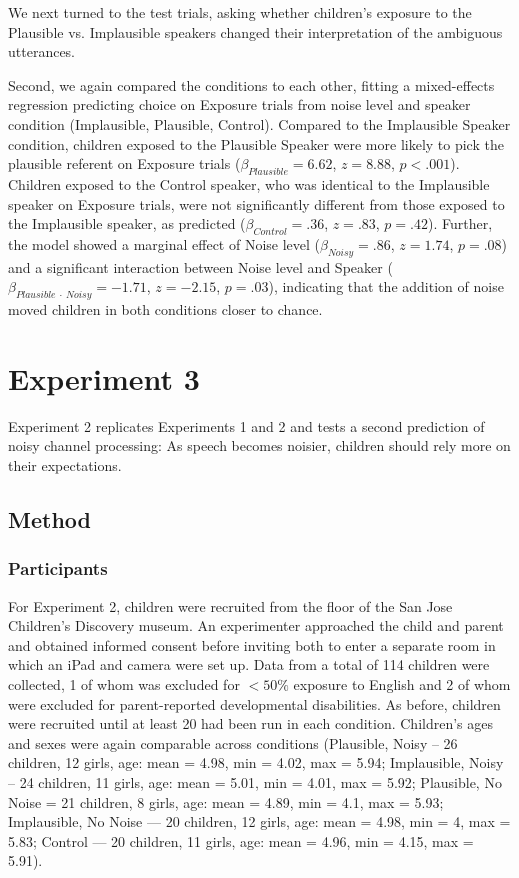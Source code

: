 \documentclass[man,floatsintext]{apa6}
\begin{document}
We next turned to the test trials, asking whether children's exposure to the Plausible vs. Implausible speakers changed their interpretation of the ambiguous utterances.


Second, we again compared the conditions to each other, fitting a mixed-effects regression predicting choice on Exposure trials from noise level and speaker condition (Implausible, Plausible, Control). Compared to the Implausible Speaker condition, children exposed to the Plausible Speaker were more likely to pick the plausible referent on Exposure trials ($\beta_{Plausible} = 6.62$,  $z = 8.88$, $p <.001$). Children exposed to the Control speaker, who was identical to the Implausible speaker on Exposure trials, were not significantly different from those exposed to the Implausible speaker, as predicted ($\beta_{Control} = .36$,  $z = .83$, $p = .42$). Further, the model showed a marginal effect of Noise level ($\beta_{Noisy} = .86$,  $z = 1.74$, $p = .08$) and a significant interaction between Noise level and Speaker ($\beta_{Plausible \: \cdot \: Noisy} = -1.71$, $z= -2.15$, $p = .03$), indicating that the addition of noise moved children in both conditions closer to chance.


\section{Experiment 3}

Experiment 2 replicates Experiments 1 and 2 and tests a second prediction of noisy channel processing: As speech becomes noisier, children should rely more on their expectations.

\subsection{Method}

\subsubsection{Participants}

For Experiment 2, children were recruited from the floor of the San Jose Children's Discovery museum. An experimenter approached the child and parent and obtained informed consent before inviting both to enter a separate room in which an iPad and camera were set up. Data from a total of 114 children were collected, 1 of whom was excluded for $<50\%$ exposure to English and 2 of whom were excluded for parent-reported developmental disabilities. As before, children were recruited until at least 20 had been run in each condition. Children's ages and sexes were again comparable across conditions (Plausible, Noisy -- 26 children, 12 girls, age: mean = 4.98, min = 4.02, max = 5.94; Implausible, Noisy -- 24 children, 11 girls, age: mean = 5.01, min = 4.01, max = 5.92; Plausible, No Noise = 21 children, 8 girls, age: mean = 4.89, min = 4.1, max = 5.93; Implausible, No Noise --- 20 children, 12 girls, age: mean = 4.98, min = 4, max = 5.83; Control --- 20 children, 11 girls, age: mean = 4.96, min = 4.15, max = 5.91).
\end{document}
